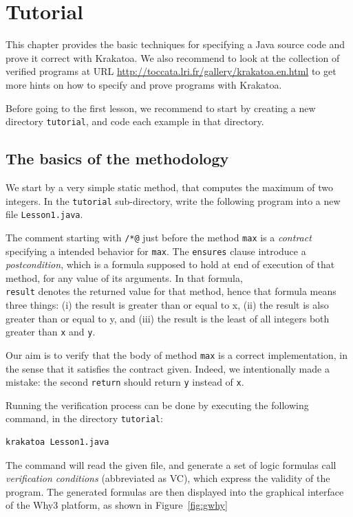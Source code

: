 \documentclass[a4paper,11pt,twoside,openright]{report}
\begin{document}
\chapter{Tutorial}
\label{chap:tutorial}

This chapter provides the basic techniques for specifying a Java
source code and prove it correct with Krakatoa. We also recommend to
look at the collection of verified programs at URL
\url{http://toccata.lri.fr/gallery/krakatoa.en.html} to get more hints
on how to specify and prove programs with Krakatoa.

Before going to the first lesson, we recommend to start by creating a new
directory \verb|tutorial|, and code each example in that directory.

\section{The basics of the methodology}

We start by a very simple static method, that computes the maximum of
two integers. In the \verb|tutorial| sub-directory, write the
following \Java{} program
into a new file \verb|Lesson1.java|.

The comment starting with \verb|/*@| just before the method
\texttt{max} is a \emph{contract} specifying a intended behavior for
\texttt{max}. 
The \texttt{ensures} clause introduce a
\emph{postcondition}, which is a formula supposed to hold at end of
execution of that method, for any value of its arguments. In that
formula, \texttt{\\result} denotes the returned value for that method,
hence that formula means three things: (i) the result is greater than or
equal to x, (ii) the result is also greater than or
equal to y, and (iii) the result is the least of all integers both
greater than \texttt{x} and \texttt{y}.

Our aim is to verify that the body of method \texttt{max} is a correct
implementation, in the sense that it satisfies the contract
given. Indeed, we intentionally made a mistake: the second
\texttt{return} should return \texttt{y} instead of \texttt{x}.

Running the verification process can be done by executing the
following command, in the directory \verb|tutorial|:
\begin{verbatim}
krakatoa Lesson1.java
\end{verbatim}
The command will read the given file, and generate a set of logic
formulas call \emph{verification conditions} (abbreviated as VC),
which express the validity of the program. The generated formulas are
then displayed into the graphical interface of the Why3
platform, as shown in Figure~\ref{fig:gwhy}
\end{document}
